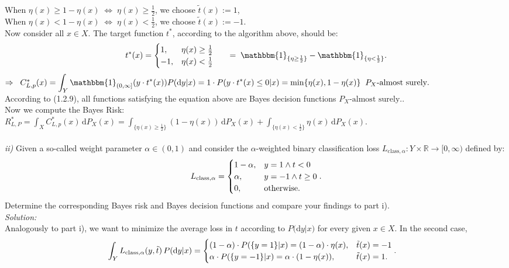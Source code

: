 \documentclass{article}
\begin{document}
When $\eta(x) \geq 1-\eta(x) \; \Leftrightarrow \; \eta(x) \geq \frac{1}{2}$, we choose $\tilde{t}(x) := 1$,\\
When $\eta(x) < 1-\eta(x) \;\Leftrightarrow\; \eta(x) < \frac{1}{2}$, we choose $\tilde{t}(x) := -1$.\\
Now consider all $x\in X$. The target function $t^*$, according to the algorithm above, should be:
\begin{align*}
t^*(x) = \begin{cases} 1, &\eta(x) \geq \frac{1}{2} \cr -1, &\eta(x) < \frac{1}{2} \end{cases} 
\indent = \; \mathbbm{1}_{\{\eta \geq \frac{1}{2}\}} - \mathbbm{1}_{\{\eta < \frac{1}{2}\}}.
\end{align*}
$\Rightarrow \;\; C^*_{L,p}(x) = \displaystyle{ \int_{Y} \mathbbm{1}_{(0,\infty]}(y\cdot t^*(x)) P(\text{d}y|x)} =  1 \cdot P(y\cdot t^*(x) \leq 0 | x) = \min \{ \eta(x), 1-\eta(x) \}\;\; P_X\text{-almost surely}.$\vspace{0.05em}\\
According to (1.2.9), all functions satisfying the equation above are Bayes decision functions $P_X\text{-almost surely}.$.\\
Now we compute the Bayes Risk:\\
$R^*_{L,P} =  \displaystyle{ \int_{X} C^*_{L,p}(x)\, \text{d}P_X(x) = \int_{\{\eta(x)\geq \frac{1}{2}\}}(1-\eta(x))\, \text{d}P_X(x) + \int_{\{\eta(x) < \frac{1}{2}\}}\eta(x)\, \text{d}P_X(x) } $.\\
 \\
\textsl{ii)} Given a so-called weight parameter $\alpha \in (0,1)$ and consider the $\alpha$-weighted binary classification loss $L_{\text{class},\alpha} : Y \times \mathbb{R} \rightarrow [0,\infty)$ defined by:
\begin{align*}
L_{\text{class},\alpha} = \begin{cases} 1-\alpha, & y=1 \land t<0 \cr \alpha, & y=-1 \land t\geq 0 \cr 0, &\text{otherwise}. \end{cases} .
\end{align*}
Determine the corresponding Bayes risk and Bayes decision functions and compare your findings to part i).
\vspace{0.5em}\\
\textsl{Solution:} \\
Analogously to part i), we want to minimize the average loss in $t$ according to $P($d$y|x)$ for every given $x \in X$. In the second case, 
\begin{align*}
\displaystyle{ \int_{Y} L_{\text{class},\alpha}(y,\tilde{t})\, P(\text{d}y|x) }
 & = \begin{cases} (1-\alpha)\cdot P(\{y=1\}|x) = (1-\alpha)\cdot \eta(x), &\tilde{t}(x) = -1 \cr  \alpha \cdot P(\{y=-1\}|x) = \alpha \cdot (1- \eta(x)), &\tilde{t}(x) = 1. \end{cases}.
\end{align*}
\end{document}
